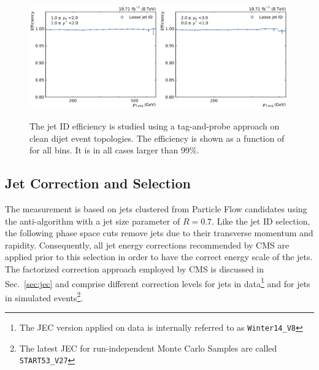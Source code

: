\begin{figure}[htbp]
    \includegraphics[width=0.49\textwidth]{figures/measurement/jetideff_yb1ys1.pdf}\hfill
    \includegraphics[width=0.49\textwidth]{figures/measurement/jetideff_yb2ys0.pdf}
    \caption[Efficiency of the jet ID]{The jet ID efficiency is studied using a
    tag-and-probe approach on clean dijet event topologies. The efficiency is
    shown as a function of \ptavg for all bins. It is in all cases larger than 99\%.}
    \label{fig:jetid_eff}
\end{figure}

\subsection{Jet Correction and Selection}

The measurement is based on jets clustered from Particle Flow candidates using
the anti-\kt algorithm with a jet size parameter of $R=0.7$. Like the jet ID
selection, the following phase space cuts remove jets due to their transverse
momentum and rapidity. Consequently, all jet energy corrections recommended by
CMS are applied prior to this selection in order to have the correct energy
scale of the jets. The factorized correction approach employed by CMS is discussed in
Sec.~\ref{sec:jec} and comprise different correction levels for jets in data\footnote{The
JEC version applied on data is internally referred to as \texttt{Winter14\_V8}}
and for jets in simulated events\footnote{The latest JEC for run-independent
Monte Carlo Samples are called \texttt{START53\_V27}}.


